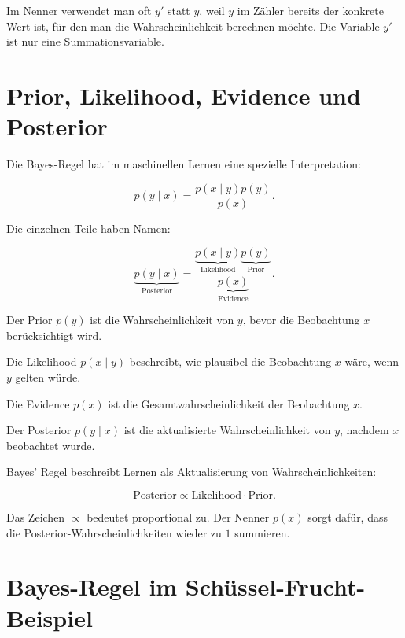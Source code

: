 \begin{notebox}
Im Nenner verwendet man oft \(y'\) statt \(y\), weil \(y\) im Zähler bereits der konkrete Wert ist, für den man die Wahrscheinlichkeit berechnen möchte.
Die Variable \(y'\) ist nur eine Summationsvariable.
\end{notebox}

\section{Prior, Likelihood, Evidence und Posterior}

Die Bayes-Regel hat im maschinellen Lernen eine spezielle Interpretation:

\[
    p(y \mid x)
    =
    \frac{
        p(x \mid y)p(y)
    }{
        p(x)
    }.
\]

Die einzelnen Teile haben Namen:

\[
    \underbrace{p(y \mid x)}_{\text{Posterior}}
    =
    \frac{
        \underbrace{p(x \mid y)}_{\text{Likelihood}}
        \underbrace{p(y)}_{\text{Prior}}
    }{
        \underbrace{p(x)}_{\text{Evidence}}
    }.
\]

\begin{definitionbox}
Der Prior \(p(y)\) ist die Wahrscheinlichkeit von \(y\), bevor die Beobachtung \(x\) berücksichtigt wird.

Die Likelihood \(p(x \mid y)\) beschreibt, wie plausibel die Beobachtung \(x\) wäre, wenn \(y\) gelten würde.

Die Evidence \(p(x)\) ist die Gesamtwahrscheinlichkeit der Beobachtung \(x\).

Der Posterior \(p(y \mid x)\) ist die aktualisierte Wahrscheinlichkeit von \(y\), nachdem \(x\) beobachtet wurde.
\end{definitionbox}

\begin{conceptbox}
Bayes' Regel beschreibt Lernen als Aktualisierung von Wahrscheinlichkeiten:

\[
    \text{Posterior}
    \propto
    \text{Likelihood}
    \cdot
    \text{Prior}.
\]

Das Zeichen \(\propto\) bedeutet proportional zu.
Der Nenner \(p(x)\) sorgt dafür, dass die Posterior-Wahrscheinlichkeiten wieder zu \(1\) summieren.
\end{conceptbox}

\section{Bayes-Regel im Schüssel-Frucht-Beispiel}

